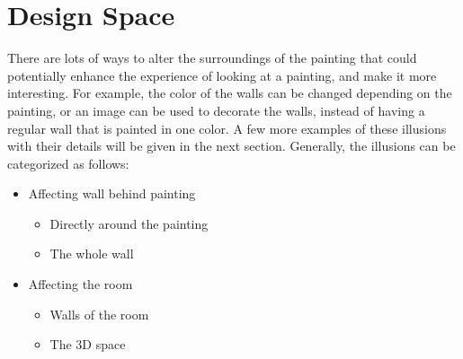 \documentclass[a4paper]{article}
\begin{document}
\section{Design Space}\label{design space}

There are lots of ways to alter the surroundings of the painting that could potentially enhance the experience of looking at a painting, and make it more interesting. For example, the color of the walls can be changed depending on the painting, or an image can be used to decorate the walls, instead of having a regular wall that is painted in one color. A few more examples of these illusions with their details will be given in the next section. Generally, the illusions can be categorized as follows:

\begin{itemize}
\item Affecting wall behind painting
\begin{itemize}
\item Directly around the painting
\item The whole wall
\end{itemize}
\item Affecting the room
\begin{itemize}
\item Walls of the room
\item The 3D space
\end{itemize}
\end{itemize}
\end{document}
